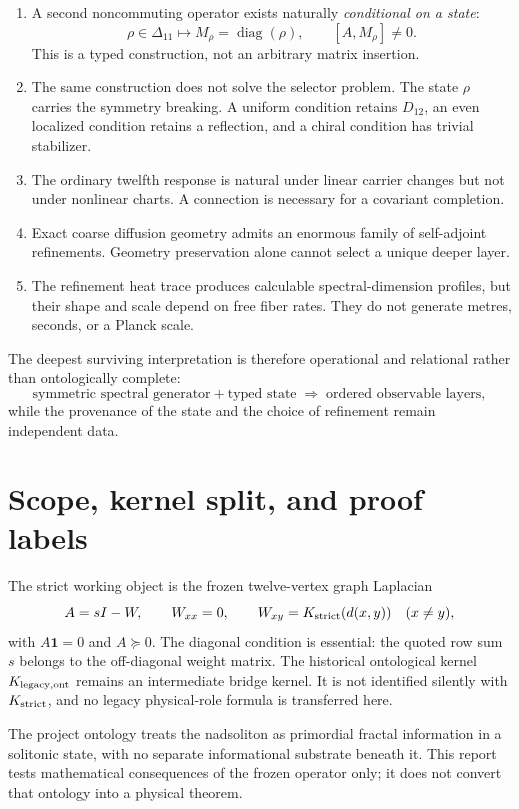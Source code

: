 \documentclass[11pt,a4paper]{article}
\newcommand{\diag}{\operatorname{diag}}
\begin{document}
\begin{enumerate}
\item A second noncommuting operator exists naturally \emph{conditional on a state}:
\[
\rho\in\Delta_{11}\longmapsto M_\rho=\diag(\rho),\qquad [A,M_\rho]\ne0.
\]
This is a typed construction, not an arbitrary matrix insertion.
\item The same construction does not solve the selector problem. The state $\rho$ carries
the symmetry breaking. A uniform condition retains $D_{12}$, an even localized condition
retains a reflection, and a chiral condition has trivial stabilizer.
\item The ordinary twelfth response is natural under linear carrier changes but not under
nonlinear charts. A connection is necessary for a covariant completion.
\item Exact coarse diffusion geometry admits an enormous family of self-adjoint
refinements. Geometry preservation alone cannot select a unique deeper layer.
\item The refinement heat trace produces calculable spectral-dimension profiles, but their
shape and scale depend on free fiber rates. They do not generate metres, seconds, or a
Planck scale.
\end{enumerate}

The deepest surviving interpretation is therefore operational and relational rather than
ontologically complete:
\[
\boxed{\text{symmetric spectral generator}+\text{typed state}
\;\Longrightarrow\;\text{ordered observable layers},}
\]
while the provenance of the state and the choice of refinement remain independent data.

\section{Scope, kernel split, and proof labels}

The strict working object is the frozen twelve-vertex graph Laplacian
\[
A=sI-W,\qquad W_{xx}=0,\qquad
W_{xy}=K_{\rm strict}(d(x,y))\quad(x\ne y),
\]
with $A\bm1=0$ and $A\succeq0$. The diagonal condition is essential: the quoted row sum
$s$ belongs to the off-diagonal weight matrix. The historical ontological kernel
$K_{\rm legacy,ont}$ remains an intermediate bridge kernel. It is not identified silently
with $K_{\rm strict}$, and no legacy physical-role formula is transferred here.

The project ontology treats the nadsoliton as primordial fractal information in a solitonic
state, with no separate informational substrate beneath it. This report tests mathematical
consequences of the frozen operator only; it does not convert that ontology into a physical
theorem.
\end{document}
